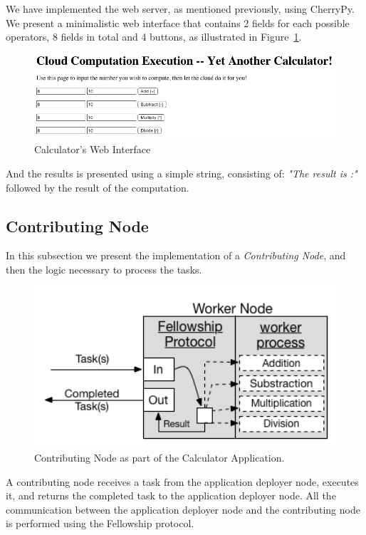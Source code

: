 \documentclass[12pt, titlepage]{uo_temp}
\begin{document}
     We have implemented the web server, as mentioned previously, using CherryPy. We present a
     minimalistic web interface that contains 2 fields for each possible operators, 8
     fields in total and 4 buttons, as illustrated in Figure~\ref{calc_home}.
     \begin{figure}[h!]
       \centering
       \includegraphics[width=125mm]{images/calc_home.png}
       \caption{Calculator's Web Interface}\label{calc_home}
     \end{figure}
     
     And the results is presented using a simple string, consisting of: \emph{"The result
       is :"} followed by the result of the computation. 
  
     \subsection{Contributing Node}
     In this subsection we present the implementation of a \emph{Contributing Node}, and then 
     the logic necessary to process the tasks.

     \begin{figure}[h!]
       \centering
       \includegraphics[width=125mm]{images/calc_node.png}
       \caption{Contributing Node as part of the Calculator Application.}
     \end{figure}
     A contributing node receives a task from the application deployer node, executes it,
     and returns the completed task to the application deployer node. All the
     communication between the application deployer node and the contributing node is
     performed using the Fellowship protocol.
\end{document}
